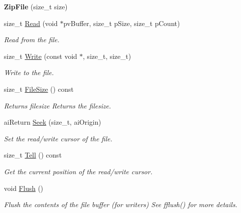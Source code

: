 \begin{DoxyCompactItemize}
\item 
\hypertarget{class_assimp_1_1_q3_b_s_p_1_1_zip_file_aa58add6105829181d5b5d32a4b8aaa02}{{\bfseries Zip\+File} (size\+\_\+t size)}\label{class_assimp_1_1_q3_b_s_p_1_1_zip_file_aa58add6105829181d5b5d32a4b8aaa02}

\item 
size\+\_\+t \hyperlink{class_assimp_1_1_q3_b_s_p_1_1_zip_file_a80562c702a71a8a5653937eef6917b0c}{Read} (void $\ast$pv\+Buffer, size\+\_\+t p\+Size, size\+\_\+t p\+Count)
\begin{DoxyCompactList}\small\item\em Read from the file. \end{DoxyCompactList}\item 
size\+\_\+t \hyperlink{class_assimp_1_1_q3_b_s_p_1_1_zip_file_a89063c9dfe5d0f025932df554a015c0d}{Write} (const void $\ast$, size\+\_\+t, size\+\_\+t)
\begin{DoxyCompactList}\small\item\em Write to the file. \end{DoxyCompactList}\item 
\hypertarget{class_assimp_1_1_q3_b_s_p_1_1_zip_file_a73748c92e437f6e7b25ee40661384425}{size\+\_\+t \hyperlink{class_assimp_1_1_q3_b_s_p_1_1_zip_file_a73748c92e437f6e7b25ee40661384425}{File\+Size} () const }\label{class_assimp_1_1_q3_b_s_p_1_1_zip_file_a73748c92e437f6e7b25ee40661384425}

\begin{DoxyCompactList}\small\item\em Returns filesize Returns the filesize. \end{DoxyCompactList}\item 
ai\+Return \hyperlink{class_assimp_1_1_q3_b_s_p_1_1_zip_file_ac883fa70ea42f8b27a37c0b3063f7ceb}{Seek} (size\+\_\+t, ai\+Origin)
\begin{DoxyCompactList}\small\item\em Set the read/write cursor of the file. \end{DoxyCompactList}\item 
size\+\_\+t \hyperlink{class_assimp_1_1_q3_b_s_p_1_1_zip_file_af63f43973b03a5867298fe808f353486}{Tell} () const 
\begin{DoxyCompactList}\small\item\em Get the current position of the read/write cursor. \end{DoxyCompactList}\item 
\hypertarget{class_assimp_1_1_q3_b_s_p_1_1_zip_file_abba2959280e3a541c9a684a8cd98fc98}{void \hyperlink{class_assimp_1_1_q3_b_s_p_1_1_zip_file_abba2959280e3a541c9a684a8cd98fc98}{Flush} ()}\label{class_assimp_1_1_q3_b_s_p_1_1_zip_file_abba2959280e3a541c9a684a8cd98fc98}

\begin{DoxyCompactList}\small\item\em Flush the contents of the file buffer (for writers) See fflush() for more details. \end{DoxyCompactList}\end{DoxyCompactItemize}
